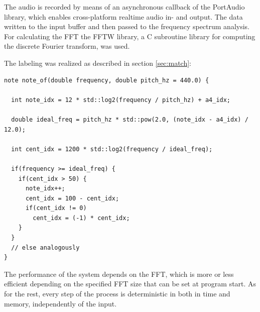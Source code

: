 \documentclass[runningheads,a4paper]{llncs}
\begin{document}
The audio is recorded by means of an asynchronous callback of the PortAudio \cite{port} library, which enables cross-platform realtime audio in- and output. The data written to the input buffer and then passed to the frequency spectrum analysis. For calculating the FFT the FFTW \cite{fftw} library, a C subroutine library for computing the discrete Fourier transform, was used.

The labeling was realized as described in section \ref{sec:match}:

\begin{lstlisting}[caption=Note detection]
note note_of(double frequency, double pitch_hz = 440.0) {

  int note_idx = 12 * std::log2(frequency / pitch_hz) + a4_idx;

  double ideal_freq = pitch_hz * std::pow(2.0, (note_idx - a4_idx) / 12.0);
  
  int cent_idx = 1200 * std::log2(frequency / ideal_freq);

  if(frequency >= ideal_freq) {
    if(cent_idx > 50) {
      note_idx++;
      cent_idx = 100 - cent_idx;
      if(cent_idx != 0)
        cent_idx = (-1) * cent_idx;
    }
  }
  // else analogously
}
\end{lstlisting}
 \label{fig:cents}

The performance of the system depends on the FFT, which is more or less efficient depending on the specified FFT size that can be set at program start. As for the rest, every step of the process is deterministic in both in time and memory, independently of the input.



\end{document}
